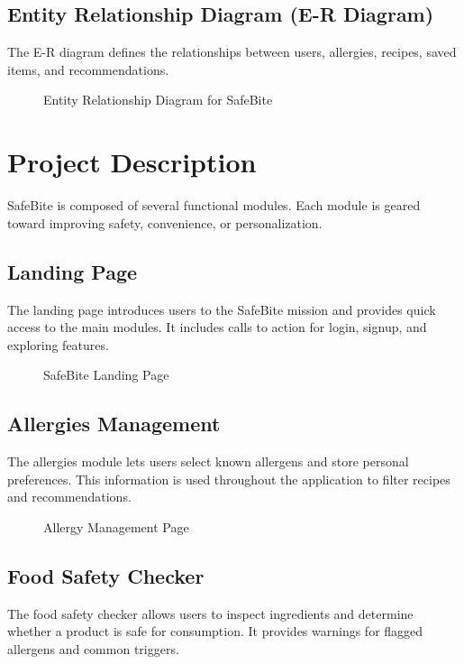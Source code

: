 \documentclass[12pt,a4paper]{report}
\begin{document}
\section{Entity Relationship Diagram (E-R Diagram)}
The E-R diagram defines the relationships between users, allergies, recipes, saved items, and recommendations.
\begin{figure}[h!]
  \centering
  \caption{Entity Relationship Diagram for SafeBite}
\end{figure}

\chapter{Project Description}
SafeBite is composed of several functional modules. Each module is geared toward improving safety, convenience, or personalization.

\section{Landing Page}
The landing page introduces users to the SafeBite mission and provides quick access to the main modules. It includes calls to action for login, signup, and exploring features.

\begin{figure}[h!]
  \centering
  \caption{SafeBite Landing Page}
\end{figure}

\section{Allergies Management}
The allergies module lets users select known allergens and store personal preferences. This information is used throughout the application to filter recipes and recommendations.

\begin{figure}[h!]
  \centering
  \caption{Allergy Management Page}
\end{figure}

\section{Food Safety Checker}
The food safety checker allows users to inspect ingredients and determine whether a product is safe for consumption. It provides warnings for flagged allergens and common triggers.
\end{document}
